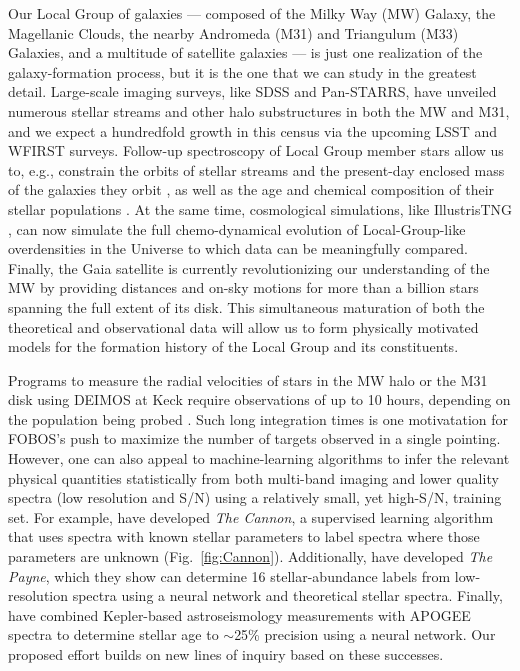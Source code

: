 \documentclass[oneside,11pt]{amsart}
\begin{document}
Our Local Group of galaxies --- composed of the Milky Way (MW) Galaxy,
the Magellanic Clouds, the nearby Andromeda (M31) and Triangulum (M33)
Galaxies, and a multitude of satellite galaxies --- is just one
realization of the galaxy-formation process, but it is the one that we
can study in the greatest detail.  Large-scale imaging surveys, like
SDSS and Pan-STARRS, have unveiled numerous stellar streams and other
halo substructures in both the MW and M31, and we expect a hundredfold
growth in this census via the upcoming LSST and WFIRST surveys.
Follow-up spectroscopy of Local Group member stars allow us to, e.g.,
constrain the orbits of stellar streams and the present-day enclosed
mass of the galaxies they orbit \citep{2017ApJ...836..234S}, as well as
the age and chemical composition of their stellar populations
\citep{2019MNRAS.484.3425M}.  At the same time, cosmological
simulations, like IllustrisTNG \citep{2018MNRAS.475..648P}, can now
simulate the full chemo-dynamical evolution of Local-Group-like
overdensities in the Universe to which data can be meaningfully
compared.  Finally, the Gaia satellite is currently revolutionizing our
understanding of the MW by providing distances and on-sky motions for
more than a billion stars spanning the full extent of its disk.  This
simultaneous maturation of both the theoretical and observational data
will allow us to form physically motivated models for the formation
history of the Local Group and its constituents.

Programs to measure the radial velocities of stars in the MW halo or the
M31 disk using DEIMOS at Keck require observations of up to 10 hours,
depending on the population being probed \citep{2012ApJ...752...45T,
2018arXiv180904082C}.  Such long integration times is one motivatation
for FOBOS's push to maximize the number of targets observed in a single
pointing.  However, one can also appeal to machine-learning algorithms
to infer the relevant physical quantities statistically from both
multi-band imaging and lower quality spectra (low resolution and S/N)
using a relatively small, yet high-S/N, training set.  For example,
\citet{2015ApJ...808...16N} have developed {\it The Cannon}, a
supervised learning algorithm that uses spectra with known stellar
parameters to label spectra where those parameters are unknown
(Fig.~\ref{fig:Cannon}).  Additionally, \citet{2018arXiv180401530T} have
developed {\it The Payne}, which they show can determine 16
stellar-abundance labels from low-resolution spectra using a neural
network and theoretical stellar spectra.  Finally,
\citet{2018arXiv180803278T} have combined Kepler-based astroseismology
measurements with APOGEE spectra to determine stellar age to $\sim$25\%
precision using a neural network.  Our proposed effort builds on new
lines of inquiry based on these successes.
\end{document}

